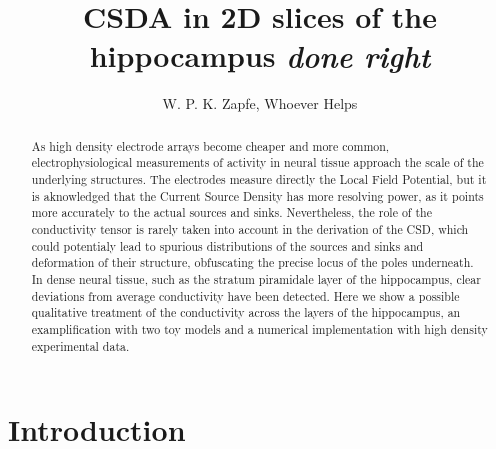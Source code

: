 \documentclass{article}
\title{CSDA in 2D slices of the hippocampus \emph{done right}}
\author{W. P. K. Zapfe, Whoever Helps}
\begin{document}
\maketitle

\begin{abstract}
As high density electrode arrays become cheaper and more common, 
electrophysiological measurements of activity in neural tissue approach
the scale of the underlying structures. The electrodes measure
directly the Local Field Potential, but it is aknowledged that the
Current Source Density has more resolving power, as it points
more accurately to the actual sources and sinks. Nevertheless,
the role of the conductivity tensor is rarely taken into account
in the derivation of the CSD, which could potentialy lead to
spurious distributions of the sources and sinks and deformation
of their structure, obfuscating the precise locus of the
poles underneath. In dense neural tissue, such as the
stratum piramidale layer of the hippocampus, clear
deviations from average conductivity have been detected. 
Here we show a possible qualitative treatment of the conductivity
across the layers of the hippocampus, an examplification
with two toy models and a numerical implementation with
high density experimental data.
\end{abstract}


\section{Introduction}
\end{document}
